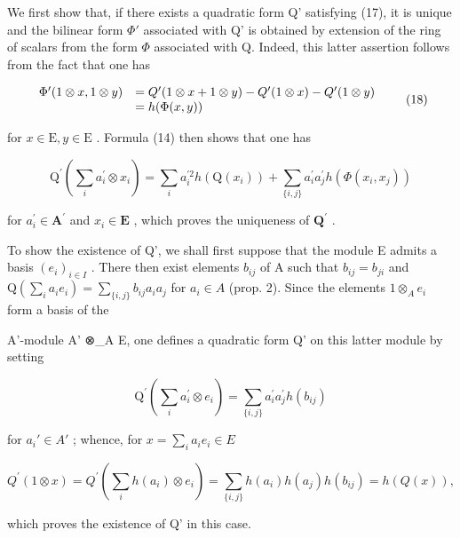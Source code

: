 We first show that, if there exists a quadratic form Q' satisfying (17), it is unique and the bilinear form \(\Phi'\) associated with Q' is obtained by extension of the ring of scalars from the form \(\Phi\) associated with Q. Indeed, this latter assertion follows from the fact that one has

\[
\begin{array}{r l} \Phi^ {\prime} (1 \otimes x, 1 \otimes y) & = Q ^ {\prime} (1 \otimes x + 1 \otimes y) - Q ^ {\prime} (1 \otimes x) - Q ^ {\prime} (1 \otimes y) \\ & = h (\Phi (x, y)) \end{array}\tag{18}
\]

for \(x \in \mathrm{E}, y \in \mathrm{E}\) . Formula (14) then shows that one has

\[
\mathrm{Q} ^ {\prime} \left(\sum_ {i} a _ {i} ^ {\prime} \otimes x _ {i}\right) = \sum_ {i} a _ {i} ^ {\prime 2} h (\mathrm{Q} (x _ {i})) + \sum_ {\{i, j \}} a _ {i} ^ {\prime} a _ {j} ^ {\prime} h (\Phi (x _ {i}, x _ {j}))\tag{19}
\]

for \(a_{i}^{\prime}\in\mathbf{A}^{\prime}\) and \(x_{i}\in\mathbf{E}\) , which proves the uniqueness of \(\mathbf{Q}^{\prime}\) .

To show the existence of Q', we shall first suppose that the module E admits a basis \((e_{i})_{i\in I}\) . There then exist elements \(b_{ij}\) of A such that \(b_{ij}=b_{ji}\) and \(\mathrm{Q}(\sum_{i}a_{i}e_{i})=\sum_{\{i,j\}}b_{ij}a_{i}a_{j}\) for \(a_{i}\in A\) (prop. 2). Since the elements \(1\otimes_{A}e_{i}\) form a basis of the

A'-module A' ⊗\_A E, one defines a quadratic form Q' on this latter module by setting

\[
\mathrm{Q} ^ {\prime} (\sum_ {i} a _ {i} ^ {\prime} \otimes e _ {i}) = \sum_ {\{i, j \}} a _ {i} ^ {\prime} a _ {j} ^ {\prime} h (b _ {i j})\tag{20}
\]

for \(a_i' \in A'\) ; whence, for \(x = \sum_{i} a_i e_i \in E\)

\[
Q ^ {\prime} (1 \otimes x) = Q ^ {\prime} (\sum_ {i} h (a _ {i}) \otimes e _ {i}) = \sum_ {\{i, j \}} h (a _ {i}) h (a _ {j}) h (b _ {i j}) = h (Q (x)),\tag{21}
\]

which proves the existence of Q' in this case.

